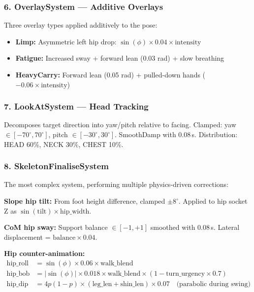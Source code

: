 \documentclass[11pt,a4paper]{article}
\begin{document}
\subsubsection{6. OverlaySystem --- Additive Overlays}

Three overlay types applied additively to the pose:
\begin{itemize}
  \item \textbf{Limp:} Asymmetric left hip drop: $\sin(\phi) \times 0.04 \times \text{intensity}$
  \item \textbf{Fatigue:} Increased sway + forward lean (0.03 rad) + slow breathing
  \item \textbf{HeavyCarry:} Forward lean (0.05 rad) + pulled-down hands ($-0.06 \times \text{intensity}$)
\end{itemize}

\subsubsection{7. LookAtSystem --- Head Tracking}

Decomposes target direction into yaw/pitch relative to facing. Clamped: yaw $\in [-70^\circ, 70^\circ]$, pitch $\in [-30^\circ, 30^\circ]$. SmoothDamp with 0.08\,s. Distribution: HEAD 60\%, NECK 30\%, CHEST 10\%.

\subsubsection{8. SkeletonFinaliseSystem}

The most complex system, performing multiple physics-driven corrections:

\textbf{Slope hip tilt:} From foot height difference, clamped $\pm 8^\circ$. Applied to hip socket Z as $\sin(\text{tilt}) \times \text{hip\_width}$.

\textbf{CoM hip sway:} Support balance $\in [-1, +1]$ smoothed with 0.08\,s. Lateral displacement = $\text{balance} \times 0.04$.

\textbf{Hip counter-animation:}
\begin{align}
  \text{hip\_roll} &= \sin(\phi) \times 0.06 \times \text{walk\_blend} \\
  \text{hip\_bob}  &= |\sin(\phi)| \times 0.018 \times \text{walk\_blend} \times (1 - \text{turn\_urgency} \times 0.7) \\
  \text{hip\_dip}  &= 4p(1-p) \times (\text{leg\_len} + \text{shin\_len}) \times 0.07 \quad \text{(parabolic during swing)}
\end{align}
\end{document}
